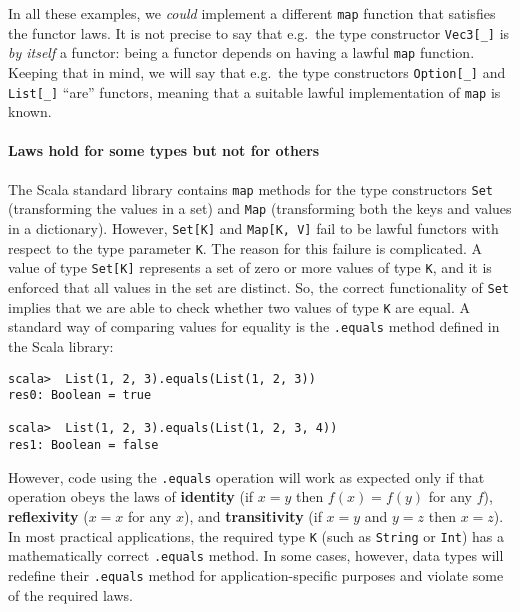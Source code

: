 In all these examples, we \emph{could} implement a different \lstinline!map!
function that satisfies the functor laws. It is not precise to say
that e.g.~the type constructor \lstinline!Vec3[_]! is \emph{by itself}
a functor: being a functor depends on having a lawful \lstinline!map!
function. Keeping that in mind, we will say that e.g.~the type constructors
\lstinline!Option[_]! and \lstinline!List[_]! ``are'' functors,
meaning that a suitable lawful implementation of \lstinline!map!
is known.

\paragraph{Laws hold for some types but not for others}

The Scala standard library contains \lstinline!map! methods for the
type constructors \lstinline!Set! (transforming the values in a set)
and \lstinline!Map! (transforming both the keys and values in a dictionary).
However, \lstinline!Set[K]! and \lstinline!Map[K, V]! fail to be
lawful functors with respect to the type parameter \lstinline!K!.
The reason for this failure is complicated. A value of type \lstinline!Set[K]!
represents a set of zero or more values of type \lstinline!K!, and
it is enforced that all values in the set are distinct. So, the correct
functionality of \lstinline!Set! implies that we are able to\emph{
}check whether two values of type \lstinline!K! are equal. A standard
way of comparing values for equality is the \lstinline!.equals! method
defined in the Scala library:
\begin{lstlisting}
scala>  List(1, 2, 3).equals(List(1, 2, 3))
res0: Boolean = true

scala>  List(1, 2, 3).equals(List(1, 2, 3, 4))
res1: Boolean = false
\end{lstlisting}
However, code using the \lstinline!.equals! operation will work as
expected only if that operation obeys the laws of \textbf{identity}
(if $x=y$ then $f(x)=f(y)$ for any $f$), \textbf{reflexivity}
($x=x$ for any $x$), and \textbf{transitivity}
(if $x=y$ and $y=z$ then $x=z$). In most practical applications,
the required type \lstinline!K! (such as \lstinline!String! or \lstinline!Int!)
has a mathematically correct \lstinline!.equals! method. In some
cases, however, data types will redefine their \lstinline!.equals!
method for application-specific purposes and violate some of the required
laws.

